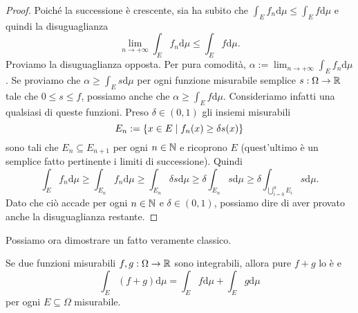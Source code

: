 \begin{proof}
Poiché la successione è crescente, sia ha subito che \(\int_E f_n \mathrm d \mu \le \int_E f \mathrm d \mu\) e quindi la disuguaglianza
\[\lim_{n \to +\infty} \int_E f_n \mathrm d \mu \le \int_E f \mathrm d \mu .\]
Proviamo la disuguaglianza opposta. Per pura comodità, \(\alpha := \lim_{n \to +\infty} \int_E f_n \mathrm d \mu\). Se proviamo che \(\alpha \ge \int_E s \mathrm d \mu\) per ogni funzione misurabile semplice \(s : \Omega \to \mathbb R\) tale che \(0 \le s \le f\), possiamo anche che \(\alpha \ge \int_E f \mathrm d \mu\). Consideriamo infatti una qualsiasi di queste funzioni. Preso \(\delta \in (0, 1)\) gli insiemi misurabili
\[E_n := \left\{x \in E \mid f_n(x) \ge \delta s(x)\right\}\]
sono tali che \(E_n \subseteq E_{n+1}\) per ogni \(n \in \mathbb N\) e ricoprono \(E\) (quest'ultimo è un semplice fatto pertinente i limiti di successione). Quindi
\[\int_E f_n \mathrm d \mu \ge \int_{E_n} f_n \mathrm d \mu \ge \int_{E_n} \delta s \mathrm d \mu \ge \delta \int_{E_n} s \mathrm d \mu \ge \delta \int_{\bigcup_{i=0}^n E_i} s \mathrm d \mu .\]
Dato che ciò accade per ogni \(n \in \mathbb N\) e \(\delta \in (0, 1)\), possiamo dire di aver provato anche la disuguaglianza restante.
\end{proof}

Possiamo ora dimostrare un fatto veramente classico.

\begin{corollario}
Se due funzioni misurabili \(f, g : \Omega \to \mathbb R\) sono integrabili, allora pure \(f+g\) lo è e
\[\int_E (f+g) \mathrm d \mu = \int_E f \mathrm d \mu + \int_E g \mathrm d \mu\]
per ogni \(E \subseteq \Omega\) misurabile.
\end{corollario}

